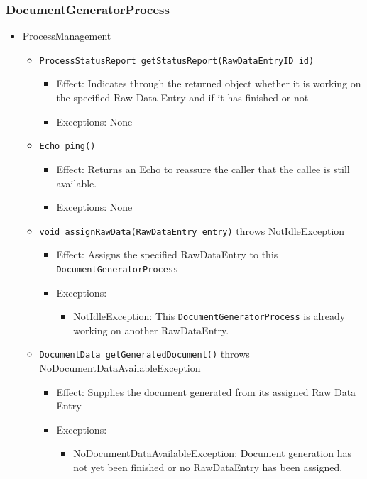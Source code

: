 \documentclass[a4paper,10pt]{article}
\begin{document}
\subsubsection*{DocumentGeneratorProcess}
\begin{itemize}
	\item ProcessManagement
	\begin{itemize}
		\item \texttt{ProcessStatusReport getStatusReport(RawDataEntryID id)}
		\begin{itemize}
			\item Effect: Indicates through the returned object whether it is working on the specified Raw Data Entry and if it has finished or not
			\item Exceptions: None
		\end{itemize}

		\item \texttt{Echo ping()}
		\begin{itemize}
			\item Effect: Returns an Echo to reassure the caller that the callee is still available.
			\item Exceptions: None
		\end{itemize}

		\item \texttt{void assignRawData(RawDataEntry entry)} throws NotIdleException
		\begin{itemize}
			\item Effect: Assigns the specified RawDataEntry to this \texttt{DocumentGeneratorProcess}
			\item Exceptions:
			\begin{itemize}
				\item NotIdleException: This \texttt{DocumentGeneratorProcess} is already working on another RawDataEntry.
			\end{itemize}
		\end{itemize}

		\item \texttt{DocumentData getGeneratedDocument()} throws NoDocumentDataAvailableException
		\begin{itemize}
			\item Effect: Supplies the document generated from its assigned Raw Data Entry
			\item Exceptions:
			\begin{itemize}
				\item NoDocumentDataAvailableException: Document generation has not yet been finished or no RawDataEntry has been assigned.
			\end{itemize}
		\end{itemize}
	\end{itemize}
\end{itemize}
\end{document}
